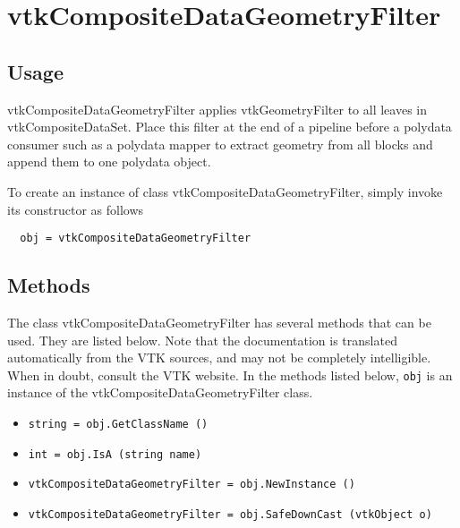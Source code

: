 \section{vtkCompositeDataGeometryFilter}

\subsection{Usage}

 vtkCompositeDataGeometryFilter applies vtkGeometryFilter to all
 leaves in vtkCompositeDataSet. Place this filter at the end of a
 pipeline before a polydata consumer such as a polydata mapper to extract
 geometry from all blocks and append them to one polydata object.

To create an instance of class vtkCompositeDataGeometryFilter, simply
invoke its constructor as follows
\begin{verbatim}
  obj = vtkCompositeDataGeometryFilter
\end{verbatim}
\subsection{Methods}

The class vtkCompositeDataGeometryFilter has several methods that can be used.
  They are listed below.
Note that the documentation is translated automatically from the VTK sources,
and may not be completely intelligible.  When in doubt, consult the VTK website.
In the methods listed below, \verb|obj| is an instance of the vtkCompositeDataGeometryFilter class.
\begin{itemize}
\item  \verb|string = obj.GetClassName ()|

\item  \verb|int = obj.IsA (string name)|

\item  \verb|vtkCompositeDataGeometryFilter = obj.NewInstance ()|

\item  \verb|vtkCompositeDataGeometryFilter = obj.SafeDownCast (vtkObject o)|

\end{itemize}

